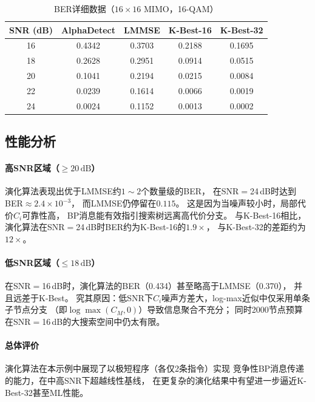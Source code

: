 \documentclass[12pt, a4paper]{ctexart}
\begin{document}
\begin{table}[H]
  \centering
  \caption{BER详细数据（$16\times16$ MIMO，16-QAM）}
  \label{tab:ber_data}
  \begin{tabular}{ccccc}
    \toprule
    SNR (dB) & AlphaDetect & LMMSE & K-Best-16 & K-Best-32 \\
    \midrule
    16 & 0.4342 & 0.3703 & 0.2188 & 0.1695 \\
    18 & 0.2628 & 0.2951 & 0.0914 & 0.0515 \\
    20 & 0.1041 & 0.2194 & 0.0215 & 0.0084 \\
    22 & 0.0239 & 0.1614 & 0.0066 & 0.0019 \\
    24 & 0.0024 & 0.1152 & 0.0013 & 0.0002 \\
    \bottomrule
  \end{tabular}
\end{table}

\subsection{性能分析}

\paragraph{高SNR区域（$\geq20\,\mathrm{dB}$）}
演化算法表现出优于LMMSE约$1\sim2$个数量级的BER，
在SNR$=$24\,dB时达到BER$\approx2.4\times10^{-3}$，
而LMMSE仍停留在$0.115$。
这是因为当噪声较小时，局部代价$C_i$可靠性高，
BP消息能有效指引搜索树远离高代价分支。
与K-Best-16相比，演化算法在SNR$=$24\,dB时BER约为K-Best-16的$1.9\times$，
与K-Best-32的差距约为$12\times$。

\paragraph{低SNR区域（$\leq18\,\mathrm{dB}$）}
在SNR$=$16\,dB时，演化算法的BER（0.434）甚至略高于LMMSE（0.370），
并且远差于K-Best。
究其原因：低SNR下$C_i$噪声方差大，log-max近似中仅采用单条子节点分支
（即$\log\max(C_M, 0)$）导致信息聚合不充分；
同时2000节点预算在SNR$=$16\,dB的大搜索空间中仍太有限。

\paragraph{总体评价}
演化算法在本示例中展现了以极短程序（各仅2条指令）实现
竞争性BP消息传递的能力，在中高SNR下超越线性基线，
在更复杂的演化结果中有望进一步逼近K-Best-32甚至ML性能。
\end{document}
